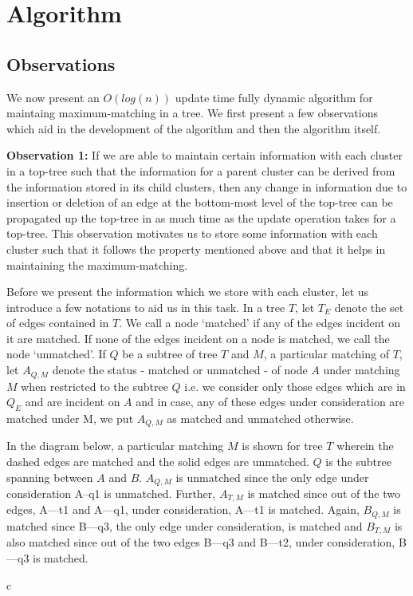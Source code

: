 \documentclass[a4paper,12pt]{article}
\begin{document}
\section{Algorithm}
\subsection{Observations\label{observations}}
We now present an $O(log(n))$ update time fully dynamic algorithm for maintaing maximum-matching in a tree. We first present a few observations which aid in the development of the algorithm and then the algorithm itself.

{\bf Observation 1:} If we are able to maintain certain information with each cluster in a top-tree such that the information for a parent cluster can be derived from the information stored in its child clusters, then any change in information due to insertion or deletion of an edge at the bottom-most level of the top-tree can be propagated up the top-tree in as much time as the update operation takes for a top-tree. This observation motivates us to store some information with each cluster such that it follows the property mentioned above and that it helps in maintaining the maximum-matching.

Before we present the information which we store with each cluster, let us introduce a few notations to aid us in this task. In a tree $T$, let $T_{E}$ denote the set of edges contained in $T$. We call a node `matched' if any of the edges incident on it are matched. If none of the edges incident on a node is matched, we call the node `unmatched'. If $Q$ be a subtree of tree $T$ and $M$, a particular matching of $T$, let $A_{Q,M}$ denote the status - matched or unmatched - of node $A$ under matching $M$ when restricted to the subtree $Q$ i.e. we consider only those edges which are in $Q_{E}$ and are incident on $A$ and in case, any of these edges under consideration are matched under M, we put $A_{Q,M}$ as matched and unmatched otherwise.



In the diagram below, a particular matching $M$ is shown for tree $T$ wherein the dashed edges are matched and the solid edges are unmatched. $Q$ is the subtree spanning between $A$ and $B$. $A_{Q,M}$ is unmatched since the only edge under consideration A--q1 is unmatched. Further, $A_{T,M}$ is matched since out of the two edges, A---t1 and A---q1, under consideration, A---t1 is matched. Again, $B_{Q,M}$ is matched since B---q3, the only edge under consideration, is matched and $B_{T,M}$ is also matched since out of the two edges B---q3 and B---t2, under consideration, B---q3 is matched.
\begin{tabular}{c}
\end{tabular}
\end{document}
